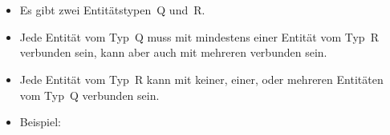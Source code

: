 %
\section{}%
%
\begin{frame}[t]%
\frametitle{}%
\begin{itemize}%
\item Es gibt zwei Entitätstypen~Q und~R.%
\item<2-> Jede Entität vom Typ~Q muss mit mindestens einer Entität vom Typ~R verbunden sein, kann aber auch mit mehreren verbunden sein.
\item<3-> Jede Entität vom Typ~R kann mit keiner, einer, oder mehreren Entitäten vom Typ~Q verbunden sein.
\item<4-> Beispiel:%
\end{itemize}%
%
%
\end{frame}%
%

